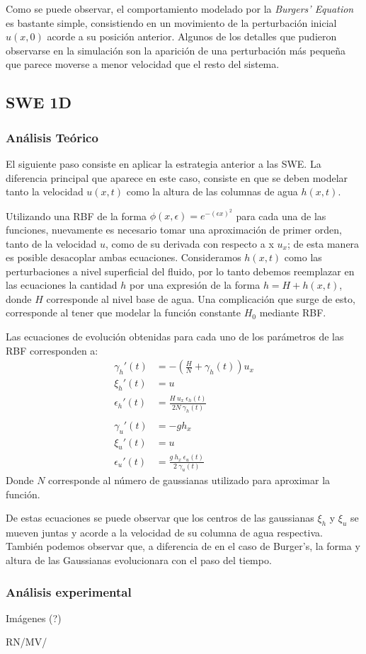 ﻿\documentclass[spanish, fleqn]{article}
\begin{document}
    Como se puede observar, el comportamiento modelado por la \textit{Burgers' Equation} es bastante simple, consistiendo en un
    movimiento de la perturbación inicial $u(x,0)$ acorde a su posición anterior. Algunos de los detalles que pudieron 
    observarse en la simulación son la aparición de una perturbación más pequeña que parece moverse a menor velocidad que el
    resto del sistema.
\subsection{SWE 1D}
  \subsubsection{Análisis Teórico}
    El siguiente paso consiste en aplicar la estrategia anterior a las SWE. La diferencia principal que aparece en este caso, consiste en que se deben modelar tanto la velocidad $u(x,t)$ como la altura de las columnas de agua $h(x,t)$.
    
    Utilizando una RBF de la forma $\displaystyle \phi(x,\epsilon) = e^{-(\epsilon x)^2}$ para cada una de las funciones, nuevamente es necesario tomar una aproximación de primer orden, tanto de la velocidad $u$, como de su derivada con respecto a x $u_x$; de esta manera es posible desacoplar ambas ecuaciones. Consideramos $h(x,t)$ como las perturbaciones a nivel superficial del fluido, por lo tanto debemos reemplazar en las ecuaciones la cantidad $h$ por una expresión de la forma $h = H + h(x,t)$, donde $H$ corresponde al nivel base de agua. Una complicación que surge de esto, corresponde al tener que modelar la función constante $H_0$ mediante RBF.

    Las ecuaciones de evolución obtenidas para cada uno de los parámetros de las RBF corresponden a:
    \begin{align*}
        \gamma _h'(t) &= -\left(\frac{H}{N} + \gamma _h(t)\right)u_x  \\
        \xi _h'(t) &= u \\
        \epsilon _h'(t) &= \frac{H \ u_x \ \epsilon_h(t)}{2 N \ \gamma_h(t)} \\
        \  \\
        \gamma _u'(t) &= -g h_x \\
        \xi _u'(t) &= u \\
        \epsilon _u'(t) &= \frac{g \ h_x \ \epsilon _u(t)}{2 \ \gamma_u(t)}
    \end{align*}
    Donde $N$ corresponde al número de gaussianas utilizado para aproximar la función.
    
    De estas ecuaciones se puede observar que los centros de las gaussianas $\xi_h$ y $\xi_u$ se mueven juntas y acorde a la velocidad de su columna de agua respectiva. También podemos observar que, a diferencia de en el caso de Burger's, la forma y altura de las Gaussianas evolucionara con el paso del tiempo.


    \subsubsection{Análisis experimental}
    Imágenes (?)
    
\vfill\hfill RN/MV/\LaTeXe
\end{document}
